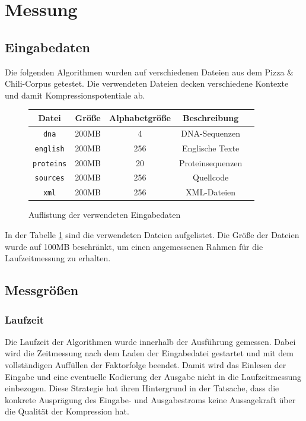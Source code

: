 \section{Messung}

\subsection{Eingabedaten}
Die folgenden Algorithmen wurden auf verschiedenen Dateien aus dem Pizza \& Chili-Corpus getestet. Die verwendeten Dateien decken verschiedene Kontexte und damit
Kompressionspotentiale ab.
\begin{figure}[h]
    \centering
    \caption{Auflistung der verwendeten Eingabedaten}
    \label{inputdata}
    \begin{tabular}{|c|c|c|c|c|}
        \hline
        \textbf{Datei} & \textbf{Größe} & \textbf{Alphabetgröße} & \textbf{Beschreibung} \\
        \hline
        \texttt{dna} & 200MB & 4 & DNA-Sequenzen \\
        \hline
        \texttt{english} & 200MB & 256 & Englische Texte \\
        \hline
        \texttt{proteins} & 200MB & 20 & Proteinsequenzen \\
        \hline
        \texttt{sources} & 200MB & 256 & Quellcode \\
        \hline
        \texttt{xml} & 200MB & 256 & XML-Dateien \\
        \hline
    \end{tabular}
\end{figure}
In der Tabelle \ref{inputdata} sind die verwendeten Dateien aufgelistet. Die Größe der Dateien wurde auf 100MB beschränkt, um einen angemessenen Rahmen für die 
Laufzeitmessung zu erhalten.

\subsection{Messgrößen}

\subsubsection{Laufzeit}
Die Laufzeit der Algorithmen wurde innerhalb der Ausführung gemessen. Dabei wird die Zeitmessung nach dem Laden der Eingabedatei gestartet und mit dem vollständigen
Auffüllen der Faktorfolge beendet. Damit wird das Einlesen der Eingabe und eine eventuelle Kodierung der Ausgabe nicht in die Laufzeitmessung einbezogen. Diese Strategie
hat ihren Hintergrund in der Tatsache, dass die konkrete Ausprägung des Eingabe- und Ausgabestroms keine Aussagekraft über die Qualität der Kompression hat.

